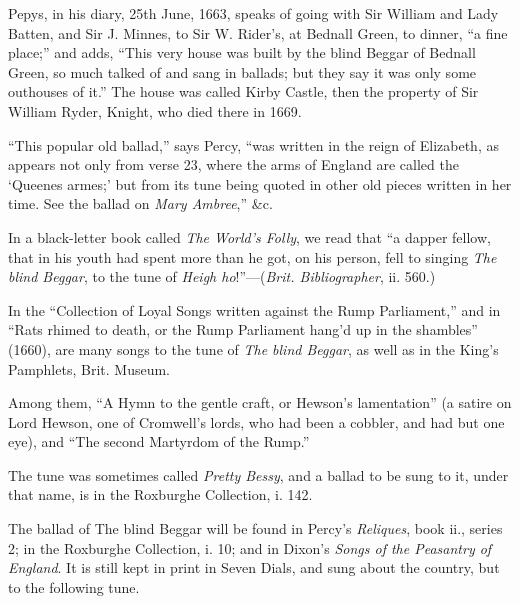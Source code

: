 Pepys, in his diary, 25th June, 1663, speaks of going with Sir William and
Lady Batten, and Sir J. Minnes, to Sir W. Rider’s, at Bednall Green, to dinner,
“a fine place;” and adds, “This very house was built by the blind Beggar of
Bednall Green, so much talked of and sang in ballads; but they say it was only
some outhouses of it.” The house was called Kirby Castle, then the property of
Sir William Ryder, Knight, who died there in 1669.

“This popular old ballad,” says Percy, “was written in the reign of Elizabeth,
as appears not only from verse 23, where the arms of England are called the
‘Queenes armes;’ but from its tune being quoted in other old pieces written in
her time. See the ballad on \textit{Mary Ambree},” \&c.

In a black-letter book called \textit{The World’s Folly}, we read that “a dapper fellow,
that in his youth had spent more than he got, on his person, fell to singing
\textit{The blind Beggar}, to the tune of \textit{Heigh ho}!”—(\textit{Brit. Bibliographer}, ii. 560.)

In the “Collection of Loyal Songs written against the Rump Parliament,” and
in “Rats rhimed to death, or the Rump Parliament hang’d up in the shambles”
(1660), are many songs to the tune of \textit{The blind Beggar}, as well as in the King’s
Pamphlets, Brit. Museum.

Among them, “A Hymn to the gentle craft, or Hewson’s lamentation”
(a satire on Lord Hewson, one of Cromwell’s lords, who had been a cobbler,
and had but one eye), and “The second Martyrdom of the Rump.”

The tune was sometimes called \textit{Pretty Bessy}, and a ballad to be sung to it,
under that name, is in the Roxburghe Collection, i. 142.



\pagebreak

The ballad of The blind Beggar will be found in Percy’s \textit{Reliques}, book ii.,
series 2; in the Roxburghe Collection, i. 10; and in Dixon’s \textit{Songs of the Peasantry
of England}. It is still kept in print in Seven Dials, and sung about the country,
but to the following tune.

\medskip




